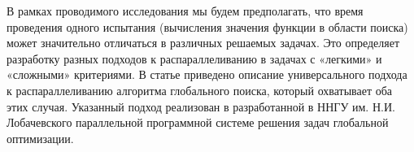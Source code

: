 \par
В рамках проводимого исследования мы будем предполагать, что время проведения одного испытания (вычисления значения функции в области поиска) может значительно отличаться в различных решаемых задачах. Это определяет разработку разных подходов к распараллеливанию в задачах с «легкими» и «сложными» критериями. В статье приведено описание универсального подхода к распараллеливанию алгоритма глобального поиска, который охватывает оба этих случая. Указанный подход реализован в разработанной в ННГУ им. Н.И. Лобачевского параллельной программной системе решения задач глобальной оптимизации.
